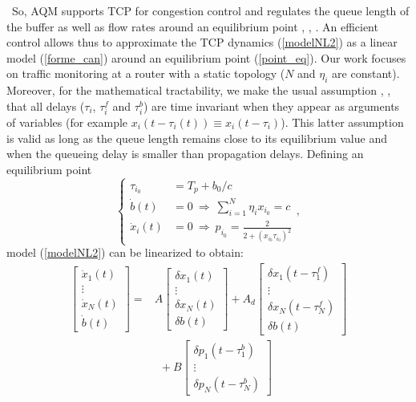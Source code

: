 \documentclass[a4paper, 10pt, onecolumn]{article}
\begin{document}
~\indent So, AQM supports TCP for congestion control and regulates the queue length of the buffer as well as flow rates around an equilibrium point \cite{Lab07b}, \cite{Kim06}, \cite{Hol02}. An efficient control allows thus to approximate the TCP dynamics (\ref{modelNL2}) as a linear model (\ref{forme_can}) around an equilibrium point (\ref{point_eq}). Our work focuses on traffic monitoring at a router with a static topology ($N$ and $\eta_i$ are constant). Moreover, for the mathematical tractability, we make the usual assumption \cite{Low02}, \cite{Hol02}, \cite{Kim06} that all delays ($\tau_i$, $\tau_i^f$ and $\tau_i^b$) are time invariant when they appear as arguments of variables (for example $x_i(t-\tau_i(t))\equiv x_i(t-\tau_i)$). This latter assumption is valid as long as the queue length remains close to its equilibrium value and when the queueing delay is smaller than propagation delays. Defining an equilibrium point
\begin{equation}
  \label{point_eq}
\left\{\begin{array}{rl}
\tau_{i_0}&=T_p+b_0/c\\
\dot{b}(t)&=0~\Rightarrow~\sum_{i=1}^N\eta_ix_{i_0}=c\\
\dot{x}_i(t)&=0~\Rightarrow~p_{i_0}=\frac{2}{2+(x_{i_0}\tau_{i_0})^2}
\end{array} \right.,
\end{equation}
model (\ref{modelNL2}) can be linearized to obtain:
{\small
\begin{equation}
\label{forme_can}
\begin{aligned}
\left[\begin{array}{c}
\dot{x}_1(t)\\\vdots\\\dot{x}_N(t)\\\dot{b}(t)\end{array}\right]=&
A\left[\begin{array}{c}
\delta x_1(t)\\\vdots\\ \delta x_N(t)\\\delta b(t)\end{array}\right]+
A_d
\left[\begin{array}{c}
\delta x_1(t-\tau_1^f)\\\vdots\\\delta x_N(t-\tau_N^f)\\\delta b(t)\end{array}\right]\\&~~+
B\left[\begin{array}{c}
\delta p_1(t-\tau_1^b)\\ \vdots\\ \delta p_N(t-\tau_N^b)\end{array}\right]
\end{aligned}
\end{equation}}
\end{document}
